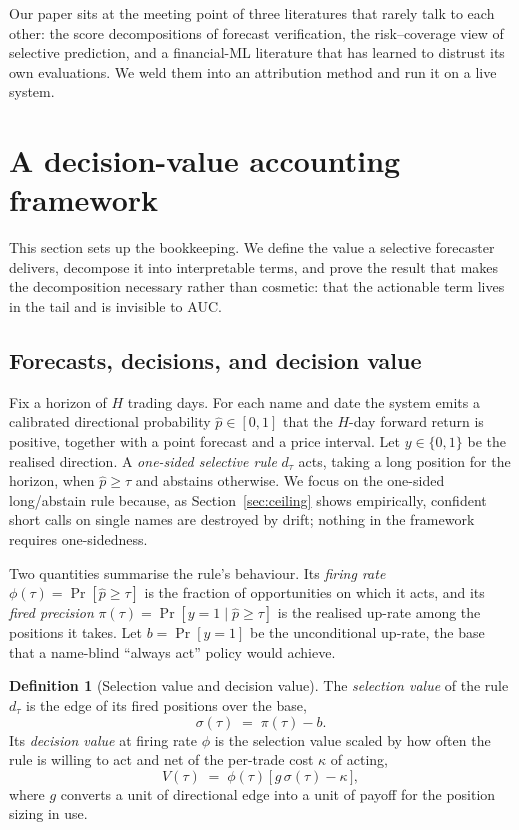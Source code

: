 \documentclass{sbc2023}%
\theoremstyle{definition}
\newtheorem{definition}{Definition}
\theoremstyle{plain}
\newcommand{\Pup}{\hat p}
\begin{document}
Our paper sits at the meeting point of three literatures that rarely talk to each
other: the score decompositions of forecast verification, the risk--coverage view
of selective prediction, and a financial-ML literature that has learned to distrust
its own evaluations. We weld them into an attribution method and run it on a live
system.

\section{A decision-value accounting framework}
\label{sec:framework}
This section sets up the bookkeeping. We define the value a selective forecaster
delivers, decompose it into interpretable terms, and prove the result that makes the
decomposition necessary rather than cosmetic: that the actionable term lives in the
tail and is invisible to AUC.

\subsection{Forecasts, decisions, and decision value}
\label{sec:defs}
Fix a horizon of $H$ trading days. For each name and date the system emits a
calibrated directional probability $\Pup\in[0,1]$ that the $H$-day forward return is
positive, together with a point forecast and a price interval. Let $y\in\{0,1\}$ be
the realised direction. A \emph{one-sided selective rule} $d_\tau$ acts, taking a long
position for the horizon, when $\Pup\ge\tau$ and abstains otherwise. We focus on the
one-sided long/abstain rule because, as Section~\ref{sec:ceiling} shows empirically,
confident short calls on single names are destroyed by drift; nothing in the
framework requires one-sidedness.

Two quantities summarise the rule's behaviour. Its \emph{firing rate}
$\phi(\tau)=\Pr[\Pup\ge\tau]$ is the fraction of opportunities on which it acts, and
its \emph{fired precision} $\pi(\tau)=\Pr[y=1\mid \Pup\ge\tau]$ is the realised up-rate
among the positions it takes. Let $b=\Pr[y=1]$ be the unconditional up-rate, the
base that a name-blind ``always act'' policy would achieve.

\begin{definition}[Selection value and decision value]
\label{def:dv}
The \emph{selection value} of the rule $d_\tau$ is the edge of its fired positions
over the base,
\begin{equation}
\label{eq:sigma}
\sigma(\tau)\;=\;\pi(\tau)-b .
\end{equation}
Its \emph{decision value} at firing rate $\phi$ is the selection value scaled by how
often the rule is willing to act and net of the per-trade cost $\kappa$ of acting,
\begin{equation}
\label{eq:dv}
V(\tau)\;=\;\phi(\tau)\,\big[\,g\,\sigma(\tau)-\kappa\,\big],
\end{equation}
where $g$ converts a unit of directional edge into a unit of payoff for the position
sizing in use.
\end{definition}
\end{document}
